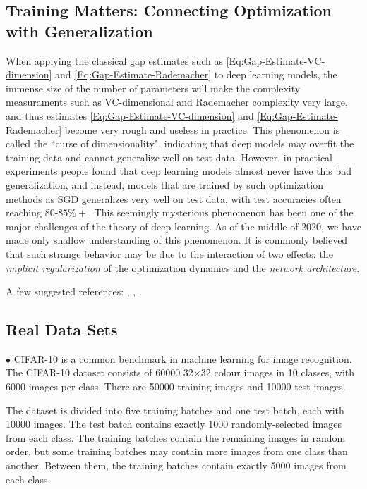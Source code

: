 \subsection{Training Matters: Connecting Optimization with Generalization}

When applying the classical gap estimates such as \eqref{Eq:Gap-Estimate-VC-dimension} and \eqref{Eq:Gap-Estimate-Rademacher} to deep learning models, the immense size of the number of parameters will make the complexity measuraments such as VC-dimensional and Rademacher complexity very large, and thus estimates \eqref{Eq:Gap-Estimate-VC-dimension} and \eqref{Eq:Gap-Estimate-Rademacher} become very rough and useless in practice. This phenomenon is called the ``curse of dimensionality", indicating that deep models may overfit the training data and cannot generalize well on test data. However, in practical experiments people found that deep learning models almost never have this bad generalization, and instead, models that are trained by such optimization methods as SGD generalizes very well on test data, with test accuracies often reaching $80$-$85\%+$. This seemingly mysterious phenomenon has been one of the major challenges of the theory of deep learning. As of the middle of 2020, we have made only shallow understanding of this phenomenon. It is commonly believed that such strange behavior may be due to the interaction of two effects: the \textit{implicit regularization} of the optimization dynamics and the \textit{network architecture}. 

A few suggested references: \cite{Cao-GuSGDGeneralization}, \cite{MeiMontanariDoubleDescent}, \cite{NTKpaper}.



\subsection{Real Data Sets}

$\bullet$ CIFAR-10 is a common benchmark in machine learning for image recognition. The CIFAR-10 dataset consists of 60000 32$\times$32 colour images in 10 classes, with 6000 images per class. There are 50000 training images and 10000 test images. 

The dataset is divided into five training batches and one test batch, each with 10000 images. The test batch contains exactly 1000 randomly-selected images from each class. The training batches contain the remaining images in random order, but some training batches may contain more images from one class than another. Between them, the training batches contain exactly 5000 images from each class. 

